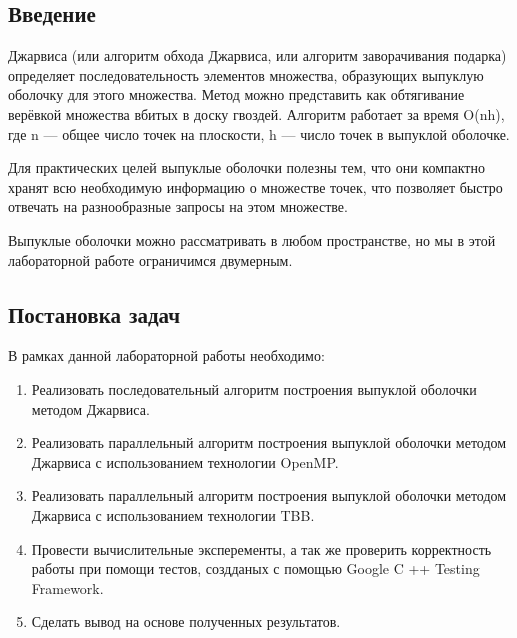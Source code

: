 \documentclass{report}
\begin{document}
\setcounter{page}{2}
\tableofcontents{}
\clearpage

\begin{center}
\section*{Введение}
\end{center}
 Джарвиса (или алгоритм обхода Джарвиса, или алгоритм заворачивания подарка) определяет последовательность элементов множества, образующих выпуклую оболочку для этого множества. Метод можно представить как обтягивание верёвкой множества вбитых в доску гвоздей. Алгоритм работает за время O(nh), где n — общее число точек на плоскости, h — число точек в выпуклой оболочке.
\par Для практических целей выпуклые оболочки полезны тем, что они компактно хранят всю необходимую информацию о множестве точек, что позволяет быстро отвечать на разнообразные запросы на этом множестве.
\par Выпуклые оболочки можно рассматривать в любом пространстве, но мы в этой лабораторной  работе ограничимся двумерным.
\newpage

\begin{center}
\section*{Постановка задач}
\end{center}
В рамках данной лабораторной работы необходимо:
\begin{enumerate}
\item Реализовать последовательный алгоритм построения выпуклой оболочки методом Джарвиса.
\item Реализовать параллельный алгоритм построения выпуклой оболочки методом Джарвиса с использованием технологии OpenMP.
\item Реализовать параллельный алгоритм построения выпуклой оболочки методом Джарвиса с использованием технологии TBB.
\item Провести вычислительные эксперементы, а так же проверить корректность работы при помощи тестов, создданых с помощью Google C ++ Testing Framework.
\item Сделать вывод на основе полученных результатов.
\end{enumerate}
\newpage
\end{document}
